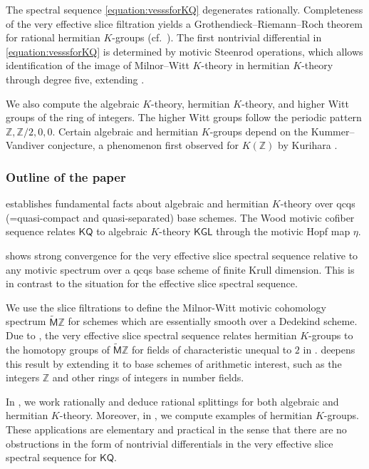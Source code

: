 \documentclass[11pt,hyp,english]{article}
\newcommand{\Z}{\mathbb{Z}}
\newcommand{\KGL}{\mathsf{KGL}}
\newcommand{\KQ}{\mathsf{KQ}}
\newcommand{\cHZ}{\wt{{\mathsf{M}}}{\Z}}
\newcommand{\wt}[1]{\widetilde{#1}}
\theoremstyle{definition}
\begin{document}
The spectral sequence \eqref{equation:vesssforKQ} degenerates rationally. Completeness of the very effective slice filtration yields a Grothendieck–Riemann–Roch theorem for rational hermitian $K$-groups (cf.~\cite{Borel-iso}). The first nontrivial differential in \eqref{equation:vesssforKQ} is determined by motivic Steenrod operations, which allows identification of the image of Milnor–Witt $K$-theory in hermitian $K$-theory through degree five, extending \cite{KO-map}.

We also compute the algebraic $K$-theory, hermitian $K$-theory, and higher Witt groups of the ring of integers. The higher Witt groups follow the periodic pattern $\Z,\Z/2,0,0$. Certain algebraic and hermitian $K$-groups depend on the Kummer–Vandiver conjecture, a phenomenon first observed for $K(\Z)$ by Kurihara \cite{zbMATH00034713}.





\subsubsection*{Outline of the paper}

 establishes fundamental facts about algebraic and hermitian $K$-theory 
over qcqs (=quasi-compact and quasi-separated) base schemes.
The Wood motivic cofiber sequence relates $\KQ$ to algebraic $K$-theory $\KGL$ 
through the motivic Hopf map $\eta$.
\vspace{0.1in}

 shows strong convergence for the very effective slice spectral 
sequence relative to any motivic spectrum over a qcqs base scheme of finite Krull dimension.
This is in contrast to the situation for the effective slice spectral sequence.
\vspace{0.1in}

We use the slice filtrations to define the Milnor-Witt motivic cohomology 
spectrum $\cHZ$ for schemes which are essentially smooth over a Dedekind scheme.
Due to \cite{Bachmann}, 
the very effective slice spectral sequence relates hermitian $K$-groups to the homotopy 
groups of $\cHZ$ for fields of characteristic unequal to $2$ in \cite{2020arXiv200406634B}.
 deepens this result by extending it to base schemes of arithmetic interest, 
such as the integers $\mathbb{Z}$ and other rings of integers in number fields. 
\vspace{0.1in}

In , 
we work rationally and deduce rational splittings for both algebraic and hermitian $K$-theory.
Moreover, 
in , 
we compute examples of hermitian $K$-groups.
These applications are elementary and practical in the sense that there are no obstructions 
in the form of nontrivial differentials in the very effective slice spectral sequence for $\KQ$.
\vspace{0.1in}
\end{document}
